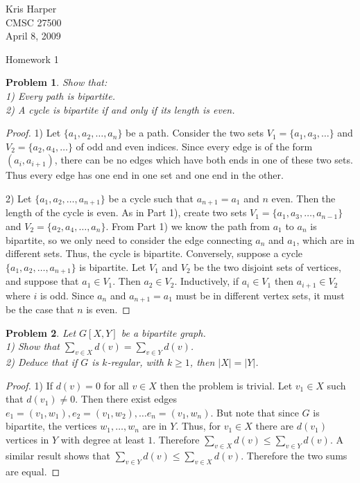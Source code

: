\documentclass{article}
\newtheorem{problem}{Problem}
\begin{document}
\begin{flushright}
Kris Harper\\

CMSC 27500\\

April 8, 2009
\end{flushright}

\begin{center}
Homework 1
\end{center}

\begin{flushleft}

\begin{problem}
Show that:\\
1) Every path is bipartite.\\
2) A cycle is bipartite if and only if its length is even.
\end{problem}
\begin{proof}
1) Let $\{a_1, a_2, \dots , a_n\}$ be a path. Consider the two sets $V_1 = \{a_1, a_3, \dots\}$ and $V_2 = \{a_2, a_4, \dots\}$ of odd and even indices. Since every edge is of the form $(a_i, a_{i+1})$, there can be no edges which have both ends in one of these two sets. Thus every edge has one end in one set and one end in the other.\newline

2) Let $\{a_1, a_2, \dots , a_{n+1}\}$ be a cycle such that $a_{n+1} = a_1$ and $n$ even. Then the length of the cycle is even. As in Part 1), create two sets $V_1 = \{a_1, a_3, \dots , a_{n-1}\}$ and $V_2 = \{a_2, a_4, \dots , a_n\}$. From Part 1) we know the path from $a_1$ to $a_n$ is bipartite, so we only need to consider the edge connecting $a_n$ and $a_1$, which are in different sets. Thus, the cycle is bipartite. Conversely, suppose a cycle $\{a_1, a_2, \dots , a_{n+1}\}$ is bipartite. Let $V_1$ and $V_2$ be the two disjoint sets of vertices, and suppose that $a_1 \in V_1$. Then $a_2 \in V_2$. Inductively, if $a_i \in V_1$ then $a_{i+1} \in V_2$ where $i$ is odd. Since $a_n$ and $a_{n+1} = a_1$ must be in different vertex sets, it must be the case that $n$ is even.
\end{proof}

\begin{problem}
Let $G[X,Y]$ be a bipartite graph.\\
1) Show that $\sum_{v \in X} d(v) = \sum_{v \in Y} d(v)$.\\
2) Deduce that if $G$ is $k$-regular, with $k \geq 1$, then $|X| = |Y|$.
\end{problem}
\begin{proof}
1) If $d(v) = 0$ for all $v \in X$ then the problem is trivial. Let $v_1 \in X$ such that $d(v_1) \neq 0$. Then there exist edges $e_1 = (v_1, w_1), e_2 = (v_1, w_2), \dots e_n = (v_1, w_n)$. But note that since $G$ is bipartite, the vertices $w_1, \dots , w_n$ are in $Y$. Thus, for $v_1 \in X$ there are $d(v_1)$ vertices in $Y$ with degree at least $1$. Therefore $\sum_{v \in X} d(v) \leq \sum_{v \in Y} d(v)$. A similar result shows that $\sum_{v \in Y} d(v) \leq \sum_{v \in X} d(v)$. Therefore the two sums are equal.\newline


\end{proof}
\end{flushleft}
\end{document}
